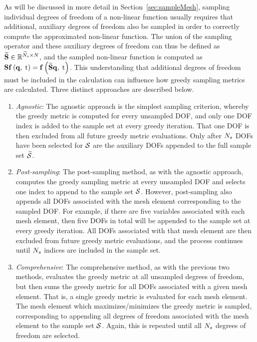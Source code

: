 As will be discussed in more detail in Section~\ref{sec:sampleMesh}, sampling individual degrees of freedom of a non-linear function usually requires that additional, auxiliary degrees of freedom also be sampled in order to correctly compute the approximated non-linear function. The union of the sampling operator and these auxiliary degrees of freedom can thus be defined as $\mathbf{\widetilde{S}} \in \mathbb{R}^{\widetilde{N}_s \times N}$, and the sampled non-linear function is computed as $\mathbf{S} \mathbf{f} \left(\mathbf{q}, \; \text{t}\right) = \mathbf{f} \left(\mathbf{\widetilde{S}} \mathbf{q}, \; \text{t}\right)$. This understanding that additional degrees of freedom must be included in the calculation can influence how greedy sampling metrics are calculated. Three distinct approaches are described below.

\begin{enumerate}
	\item \textit{Agnostic}: The agnostic approach is the simplest sampling criterion, whereby the greedy metric is computed for every unsampled DOF, and only one DOF index is added to the sample set at every greedy iteration. That one DOF is then excluded from all future greedy metric evaluations. Only after $N_s$ DOFs have been selected for $\mathcal{S}$ are the auxiliary DOFs appended to the full sample set $\mathcal{\widetilde{S}}$.
	\item \textit{Post-sampling}: The post-sampling method, as with the agnostic approach, computes the greedy sampling metric at every unsampled DOF and selects one index to append to the sample set $\mathcal{S}$. However, post-sampling also appends all DOFs associated with the mesh element corresponding to the sampled DOF. For example, if there are five variables associated with each mesh element, then five DOFs in total will be appended to the sample set at every greedy iteration. All DOFs associated with that mesh element are then excluded from future greedy metric evaluations, and the process continues until $N_s$ indices are included in the sample set.
	\item \textit{Comprehensive}: The comprehensive method, as with the previous two methods, evaluates the greedy metric at all unsampled degrees of freedom, but then sums the greedy metric for all DOFs associated with a given mesh element. That is, a single greedy metric is evaluated for each mesh element. The mesh element which maximizes/minimizes the greedy metric is sampled, corresponding to appending all degrees of freedom associated with the mesh element to the sample set $\mathcal{S}$. Again, this is repeated until all $N_s$ degrees of freedom are selected.
\end{enumerate}

